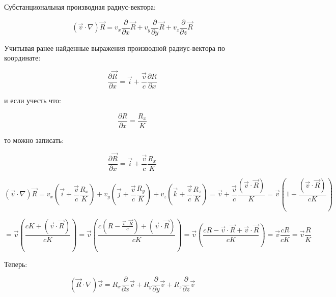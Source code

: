 \documentclass[12pt, a4paper]{article}
\begin{document}
Субстанциональная производная радиус-вектора:

\begin{equation}
(\vec{v} \cdot \nabla) \vec{R} = v_x \frac{\partial}{\partial x} \vec{R} + v_y \frac{\partial}{\partial y} \vec{R} + v_z \frac{\partial}{\partial z} \vec{R}
\label{eq:substantial_R}
\end{equation}

Учитывая ранее найденные выражения производной радиус-вектора по координате:

\begin{equation}
\frac{\partial \vec{R}}{\partial x} = \vec{i} + \frac{\vec{v}}{c} \frac{\partial R}{\partial x}
\label{eq:dR_dx_again}
\end{equation}

и если учесть что:

\begin{equation}
\frac{\partial R}{\partial x} = \frac{R_x}{K}
\label{eq:dR_dx_again2}
\end{equation}

то можно записать:

\begin{equation}
\frac{\partial \vec{R}}{\partial x} = \vec{i} + \frac{\vec{v}}{c} \frac{R_x}{K}
\label{eq:dR_dx_again3}
\end{equation}

\begin{equation}
(\vec{v} \cdot \nabla) \vec{R} = v_x \left( \vec{i} + \frac{\vec{v}}{c} \frac{R_x}{K} \right) + v_y \left( \vec{j} + \frac{\vec{v}}{c} \frac{R_y}{K} \right) + v_z \left( \vec{k} + \frac{\vec{v}}{c} \frac{R_z}{K} \right) = \vec{v} + \frac{\vec{v}}{c} \frac{(\vec{v} \cdot \vec{R})}{K} = \vec{v} \left( 1 + \frac{(\vec{v} \cdot \vec{R})}{cK} \right)
\label{eq:substantial_R_expanded}
\end{equation}

\begin{equation}
= \vec{v} \left( \frac{cK + (\vec{v} \cdot \vec{R})}{cK} \right) = \vec{v} \left( \frac{c \left( R - \frac{\vec{v} \cdot \vec{R}}{c} \right) + (\vec{v} \cdot \vec{R})}{cK} \right) = \vec{v} \left( \frac{cR - \vec{v} \cdot \vec{R} + \vec{v} \cdot \vec{R}}{cK} \right) = \vec{v} \frac{cR}{cK} = \vec{v} \frac{R}{K}
\label{eq:substantial_R_final}
\end{equation}

Теперь:

\begin{equation}
(\vec{R} \cdot \nabla) \vec{v} = R_x \frac{\partial}{\partial x} \vec{v} + R_y \frac{\partial}{\partial y} \vec{v} + R_z \frac{\partial}{\partial z} \vec{v}
\label{eq:R_grad_v}
\end{equation}
\end{document}
